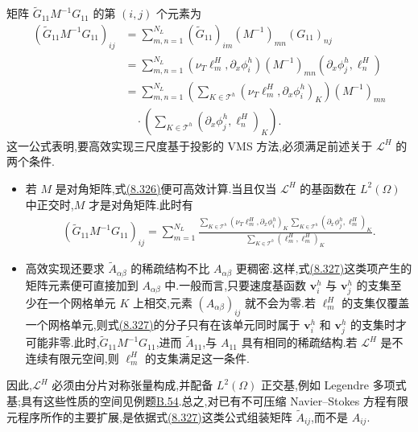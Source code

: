 \begin{note}[方法(8.288)的实现]
矩阵 $\widetilde G_{11}M^{-1}G_{11}$ 的第 $(i,j)$ 个元素为
\begin{equation}\label{eq:vms-coarse-projection-implementation-product}
\begin{aligned}
 (\widetilde G_{11}M^{-1}G_{11})_{ij}
 &=\sum_{m,n=1}^{N_L}(\widetilde G_{11})_{im}(M^{-1})_{mn}(G_{11})_{nj}\\
 &=\sum_{m,n=1}^{N_L}
   (\nu_T\ell_m^H,\partial_x\phi_i^h)(M^{-1})_{mn}
   (\partial_x\phi_j^h,\ell_n^H)\\
 &=\sum_{m,n=1}^{N_L}
   \left(\sum_{K\in\mathcal T^h}
      (\nu_T\ell_m^H,\partial_x\phi_i^h)_K\right)
   (M^{-1})_{mn}\\
 &\quad\cdot
   \left(\sum_{K\in\mathcal T^h}
      (\partial_x\phi_j^h,\ell_n^H)_K\right).
\end{aligned}
\end{equation}
这一公式表明,要高效实现三尺度基于投影的 VMS 方法,必须满足前述关于 $\mathcal L^H$ 的两个条件.
\begin{itemize}
 \item 若 $M$ 是对角矩阵,式\hyperref[eq:vms-coarse-projection-implementation-product]{(8.326)}便可高效计算.当且仅当 $\mathcal L^H$ 的基函数在 $L^2(\Omega)$ 中正交时,$M$ 才是对角矩阵.此时有
 \begin{equation}\label{eq:vms-coarse-projection-orthogonal-mass-product}
 \begin{aligned}
  (\widetilde G_{11}M^{-1}G_{11})_{ij}
  =\sum_{m=1}^{N_L}
  \frac{
   \displaystyle\sum_{K\in\mathcal T^h}
     (\nu_T\ell_m^H,\partial_x\phi_i^h)_K
   \,
   \displaystyle\sum_{K\in\mathcal T^h}
     (\partial_x\phi_j^h,\ell_m^H)_K}
   {\displaystyle\sum_{K\in\mathcal T^h}
     (\ell_m^H,\ell_m^H)_K}.
 \end{aligned}
 \end{equation}
 \item 高效实现还要求 $\widetilde A_{\alpha\beta}$ 的稀疏结构不比 $A_{\alpha\beta}$ 更稠密.这样,式\hyperref[eq:vms-coarse-projection-orthogonal-mass-product]{(8.327)}这类项产生的矩阵元素便可直接加到 $A_{\alpha\beta}$ 中.一般而言,只要速度基函数 $\bm v_i^h$ 与 $\bm v_j^h$ 的支集至少在一个网格单元 $K$ 上相交,元素 $(A_{\alpha\beta})_{ij}$ 就不会为零.若 $\ell_m^H$ 的支集仅覆盖一个网格单元,则式\hyperref[eq:vms-coarse-projection-orthogonal-mass-product]{(8.327)}的分子只有在该单元同时属于 $\bm v_i^h$ 和 $\bm v_j^h$ 的支集时才可能非零.此时,$\widetilde G_{11}M^{-1}G_{11}$,进而 $\widetilde A_{11}$,与 $A_{11}$ 具有相同的稀疏结构.若 $\mathcal L^H$ 是不连续有限元空间,则 $\ell_m^H$ 的支集满足这一条件.
\end{itemize}
因此,$\mathcal L^H$ 必须由分片对称张量构成,并配备 $L^2(\Omega)$ 正交基,例如 Legendre 多项式基;具有这些性质的空间见例题\hyperref[ex:appendix-b-54]{B.54}.总之,对已有不可压缩 Navier--Stokes 方程有限元程序所作的主要扩展,是依据式\hyperref[eq:vms-coarse-projection-orthogonal-mass-product]{(8.327)}这类公式组装矩阵 $\widetilde A_{ij}$,而不是 $A_{ij}$.
\end{note}

